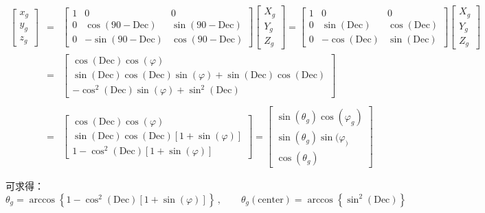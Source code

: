 \documentclass[11pt, a4paper]{article}  %
\begin{document}
\begin{CJK}{UTF8}{gbsn}
\begin{eqnarray}
	\begin{bmatrix} x_g \\ y_g \\ z_g \end{bmatrix}
		&=& \begin{bmatrix} 1 & 0 & 0 \\ 0 & \cos(90-\text{Dec}) & \sin(90-\text{Dec}) \\ 0 & -\sin(90-\text{Dec}) & \cos(90-\text{Dec}) \end{bmatrix} \begin{bmatrix} X_g \\ Y_g \\ Z_g \end{bmatrix}
		= \begin{bmatrix} 1 & 0 & 0 \\ 0 & \sin(\text{Dec}) & \cos(\text{Dec}) \\ 0 & -\cos(\text{Dec}) & \sin(\text{Dec}) \end{bmatrix} \begin{bmatrix} X_g \\ Y_g \\ Z_g \end{bmatrix} \nonumber \\
		&=& \begin{bmatrix} \cos(\text{Dec})\cos(\varphi) \\ \sin(\text{Dec})\cos(\text{Dec})\sin(\varphi) + \sin(\text{Dec})\cos(\text{Dec}) \\ -\cos^2(\text{Dec})\sin(\varphi) + \sin^2(\text{Dec}) \end{bmatrix} \nonumber \\ \nonumber \\
		&=& \begin{bmatrix} \cos(\text{Dec})\cos(\varphi) \\ \sin(\text{Dec})\cos(\text{Dec})\left[1 + \sin(\varphi)\right] \\ 1-\cos^2(\text{Dec})\left[1 + \sin(\varphi)\right] \end{bmatrix} 
		= \begin{bmatrix} \sin(\theta_g)\cos(\varphi_g) \\ \sin(\theta_g)\sin(\varphi_) \\ \cos(\theta_g) \end{bmatrix}
\end{eqnarray}

可求得：
\begin{equation}
	\theta_g = \arccos\left\{ 1 - \cos^2(\text{Dec}) \left[1 + \sin(\varphi) \right] \right\} \, , \qquad
	\theta_g(\text{center}) = \arccos\left\{ \sin^2(\text{Dec}) \right\}
\end{equation}


\end{CJK}
\end{document}

